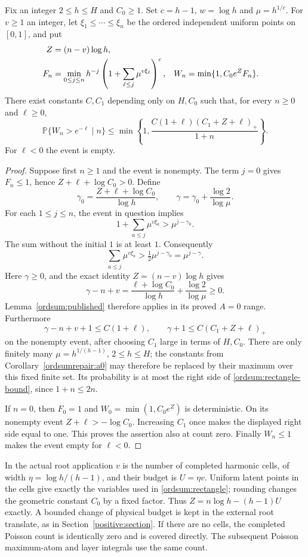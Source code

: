 \begin{lemma}
\label{ordsum:rectangle-tail}
Fix an integer $2\leq h\leq H$ and $C_0\geq1$. Set
$c=h-1$, $w=\log h$ and $\mu=h^{1/c}$. For $v\geq1$ an integer,
let $\xi_1\leq\cdots\leq\xi_n$ be the ordered independent uniform
points on $[0,1]$, and put
\begin{align}
 Z&=(n-v)\log h,\notag\\
 F_n&=\min_{0\leq j\leq n}
       h^{-j}\left(1+\sum_{\ell\leq j}\mu^{v\xi_\ell}\right)^c,
 & W_n&=\min\{1,C_0e^Z F_n\}.
 \label{ordsum:rectangle}
\end{align}
There exist constants $C,C_1$ depending only on $H,C_0$ such that,
for every $n\geq0$ and $\ell\geq0$,
\begin{equation}
 \mathbb P\{W_n>e^{-\ell}\mid n\}
 \leq\min\left\{1,
       \frac{C(1+\ell)(C_1+Z+\ell)_+}{1+n}\right\}.
 \label{ordsum:rectangle-bound}
\end{equation}
For $\ell<0$ the event is empty.
\end{lemma}

\begin{proof}
Suppose first $n\geq1$ and the event is nonempty. The term $j=0$
gives $F_n\leq1$, hence $Z+\ell+\log C_0>0$. Define
\[
 \gamma_0=\frac{Z+\ell+\log C_0}{\log h},
 \qquad \gamma=\gamma_0+\frac{\log2}{\log\mu}.
\]
For each $1\leq j\leq n$, the event in question implies
\[
 1+\sum_{a\leq j}\mu^{v\xi_a}>\mu^{j-\gamma_0}.
\]
The sum without the initial $1$ is at least $1$. Consequently
\[
 \sum_{a\leq j}\mu^{v\xi_a}
       >\tfrac12\mu^{j-\gamma_0}=\mu^{j-\gamma}.
\]
Here $\gamma\geq0$, and the exact identity $Z=(n-v)\log h$ gives
\[
 \gamma-n+v
   =\frac{\ell+\log C_0}{\log h}
      +\frac{\log2}{\log\mu}\geq0.
\]
Lemma~\ref{ordsum:published} therefore applies in its proved $A=0$ range.
Furthermore
\[
 \gamma-n+v+1\leq C(1+\ell),\qquad
 \gamma+1\leq C(C_1+Z+\ell)_+
\]
on the nonempty event, after choosing $C_1$ large in terms of $H,C_0$.
There are only finitely many $\mu=h^{1/(h-1)}$, $2\leq h\leq H$;
the constants from Corollary~\ref{ordsumrepair:a0} may therefore be
replaced by their maximum over this fixed finite set.
Its probability is at most the right side of
\eqref{ordsum:rectangle-bound}, since $1+n\leq2n$.

If $n=0$, then $F_0=1$ and $W_0=\min(1,C_0e^Z)$ is deterministic.
On its nonempty event $Z+\ell> -\log C_0$. Increasing $C_1$ once
makes the displayed right side equal to one. This proves the assertion
also at count zero. Finally $W_n\leq1$ makes the event empty for
$\ell<0$.
\end{proof}

In the actual root application $v$ is the number of completed harmonic
cells, of width $\eta=\log h/(h-1)$, and their budget is $U=\eta v$.
Uniform latent points in the cells give exactly the variables used in
\eqref{ordsum:rectangle}; rounding changes the geometric constant $C_0$
by a fixed factor. Thus $Z=n\log h-(h-1)U$ exactly. A bounded change
of physical budget is kept in the external root translate, as in
Section~\ref{positive:section}. If there are no cells, the completed
Poisson count is identically zero and is covered directly. The subsequent
Poisson maximum-atom and layer integrals use the same count.
